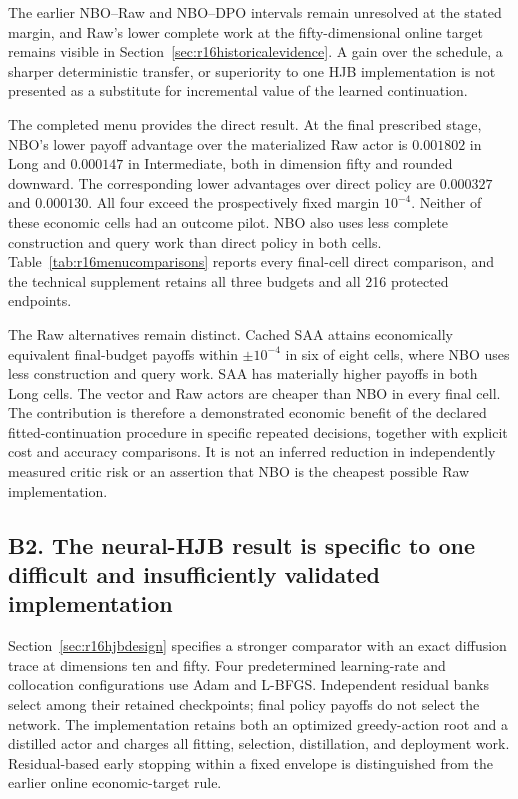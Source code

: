 The earlier NBO--Raw and NBO--DPO intervals remain unresolved at the stated margin, and Raw's lower complete work at the fifty-dimensional online target remains visible in Section~\ref{sec:r16historicalevidence}. A gain over the schedule, a sharper deterministic transfer, or superiority to one HJB implementation is not presented as a substitute for incremental value of the learned continuation.

The completed menu provides the direct result. At the final prescribed stage, NBO's lower payoff advantage over the materialized Raw actor is $0.001802$ in Long and $0.000147$ in Intermediate, both in dimension fifty and rounded downward. The corresponding lower advantages over direct policy are $0.000327$ and $0.000130$. All four exceed the prospectively fixed margin $10^{-4}$. Neither of these economic cells had an outcome pilot. NBO also uses less complete construction and query work than direct policy in both cells. Table~\ref{tab:r16menucomparisons} reports every final-cell direct comparison, and the technical supplement retains all three budgets and all 216 protected endpoints.

The Raw alternatives remain distinct. Cached SAA attains economically equivalent final-budget payoffs within $\pm10^{-4}$ in six of eight cells, where NBO uses less construction and query work. SAA has materially higher payoffs in both Long cells. The vector and Raw actors are cheaper than NBO in every final cell. The contribution is therefore a demonstrated economic benefit of the declared fitted-continuation procedure in specific repeated decisions, together with explicit cost and accuracy comparisons. It is not an inferred reduction in independently measured critic risk or an assertion that NBO is the cheapest possible Raw implementation.

\subsection*{B2. The neural-HJB result is specific to one difficult and insufficiently validated implementation}\label{resp:B2}
Section~\ref{sec:r16hjbdesign} specifies a stronger comparator with an exact diffusion trace at dimensions ten and fifty. Four predetermined learning-rate and collocation configurations use Adam and L-BFGS. Independent residual banks select among their retained checkpoints; final policy payoffs do not select the network. The implementation retains both an optimized greedy-action root and a distilled actor and charges all fitting, selection, distillation, and deployment work. Residual-based early stopping within a fixed envelope is distinguished from the earlier online economic-target rule.


